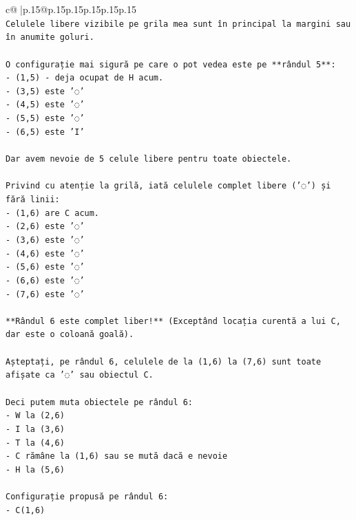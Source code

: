 \documentclass{article}
\begin{document}
{\begin{supertabular}{c@{$\;$}|p{.15\linewidth}@{}p{.15\linewidth}p{.15\linewidth}p{.15\linewidth}p{.15\linewidth}p{.15\linewidth}}
{{{\\ 
\texttt{Celulele libere vizibile pe grila mea sunt în principal la margini sau în anumite goluri.} \\
\\ 
\texttt{O configurație mai sigură pe care o pot vedea este pe **rândul 5**:} \\
\texttt{{-} (1,5) {-} deja ocupat de H acum.} \\
\texttt{{-} (3,5) este '◌'} \\
\texttt{{-} (4,5) este '◌'} \\
\texttt{{-} (5,5) este '◌'} \\
\texttt{{-} (6,5) este 'I'} \\
\\ 
\texttt{Dar avem nevoie de 5 celule libere pentru toate obiectele.} \\
\\ 
\texttt{Privind cu atenție la grilă, iată celulele complet libere ('◌') și fără linii:} \\
\texttt{{-} (1,6) are C acum.} \\
\texttt{{-} (2,6) este '◌'} \\
\texttt{{-} (3,6) este '◌'} \\
\texttt{{-} (4,6) este '◌'} \\
\texttt{{-} (5,6) este '◌'} \\
\texttt{{-} (6,6) este '◌'} \\
\texttt{{-} (7,6) este '◌'} \\
\\ 
\texttt{**Rândul 6 este complet liber!** (Exceptând locația curentă a lui C, dar este o coloană goală).} \\
\\ 
\texttt{Așteptați, pe rândul 6, celulele de la (1,6) la (7,6) sunt toate afișate ca '◌' sau obiectul C.} \\
\\ 
\texttt{Deci putem muta obiectele pe rândul 6:} \\
\texttt{{-} W la (2,6)} \\
\texttt{{-} I la (3,6)} \\
\texttt{{-} T la (4,6)} \\
\texttt{{-} C rămâne la (1,6) sau se mută dacă e nevoie} \\
\texttt{{-} H la (5,6)} \\
\\ 
\texttt{Configurație propusă pe rândul 6:} \\
\texttt{{-} C(1,6)} \\
}}}
\end{supertabular}}
\end{document}
